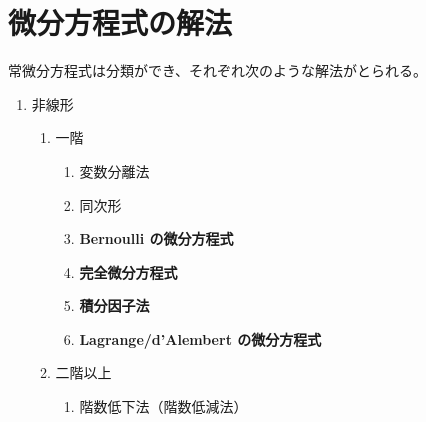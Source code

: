 \newpage
\section{微分方程式の解法}
常微分方程式は分類ができ、それぞれ次のような解法がとられる。
\begin{enumerate}[label=\Alph*.]
  \item 非線形
  \begin{enumerate}[label=\arabic*.]
    \item 一階
    \begin{enumerate}[label=\bullet]
      \item 変数分離法
      \item 同次形 
      \item \textbf{Bernoulli の微分方程式} 
      \item \textbf{完全微分方程式} 
      \item \textbf{積分因子法} 
      \item \textbf{Lagrange/d'Alembert の微分方程式} 
    \end{enumerate}
    \item 二階以上
    \begin{enumerate}[label=\bullet]
      \item 階数低下法（階数低減法）
    \end{enumerate}
  \end{enumerate}
  \baselineskip


\end{enumerate}
